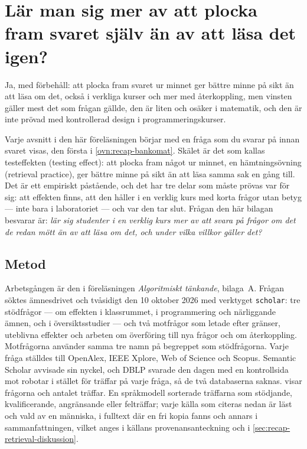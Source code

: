 
\setcounter{LTchunksize}{4}

\chapter{Lär man sig mer av att plocka fram svaret själv än av att läsa
  det igen?}
\label{app:recap-retrieval}

Ja, med förbehåll: att plocka fram svaret ur minnet ger bättre minne på
sikt än att läsa om det, också i verkliga kurser och mer med
återkoppling, men vinsten gäller mest det som frågan gällde, den är liten
och osäker i matematik, och den är inte prövad med kontrollerad design i
programmeringskurser.

Varje avsnitt i den här föreläsningen börjar med en fråga som du svarar
på innan svaret visas, den första i \cref{ovn:recap-bankomat}.
Skälet är det som kallas testeffekten (\foreignlanguage{english}{testing
effect}): att plocka fram något ur minnet, en hämtningsövning
(\foreignlanguage{english}{retrieval practice}), ger bättre minne på sikt
än att läsa samma sak en gång till\autocite{Rowland2014Testing}.  Det är
ett empiriskt påstående, och det har tre delar som måste prövas var för
sig: att effekten finns, att den håller i en verklig kurs med korta
frågor utan betyg --- inte bara i laboratoriet --- och var den tar slut.
Frågan den här bilagan besvarar är: \emph{lär sig studenter i en
verklig kurs mer av att svara på frågor om det de redan mött än av att
läsa om det, och under vilka villkor gäller det?}

\section{Metod}
\label{sec:recap-retrieval-metod}

Arbetsgången är den i föreläsningen \emph{Algoritmiskt tänkande},
bilaga~A.  Frågan söktes ämnesdrivet och tvåsidigt den 10 oktober 2026
med verktyget \texttt{scholar}: tre stödfrågor --- om effekten i
klassrummet, i programmering och närliggande ämnen, och i
översiktsstudier --- och två motfrågor som letade efter gränser, uteblivna
effekter och arbeten om överföring till nya frågor och om återkoppling.
Motfrågorna använder samma tre namn på begreppet som stödfrågorna.  Varje
fråga ställdes till OpenAlex, IEEE Xplore, Web of Science och Scopus.
Semantic Scholar avvisade sin nyckel, och DBLP svarade den dagen med en
kontrollsida mot robotar i stället för träffar på varje fråga, så de två
databaserna saknas.   visar frågorna
och antalet träffar.  En språkmodell sorterade träffarna som stödjande,
kvalificerande, angränsande eller felträffar; varje källa som citeras
nedan är läst och vald av en människa, i fulltext där en fri kopia fanns
och annars i sammanfattningen, vilket anges i källans provenansanteckning
och i \cref{sec:recap-retrieval-diskussion}.

